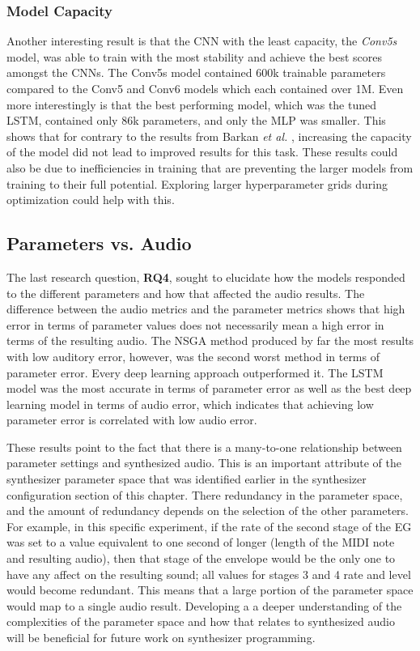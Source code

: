 \subsubsection{Model Capacity}
Another interesting result is that the CNN with the least capacity, the \textit{Conv5s} model, was able to train with the most stability and achieve the best scores amongst the CNNs. The Conv5s model contained 600k trainable parameters compared to the Conv5 and Conv6 models which each contained over 1M. Even more interestingly is that the best performing model, which was the tuned LSTM, contained only 86k parameters, and only the MLP was smaller. This shows that for contrary to the results from Barkan \textit{et al.} \cite{barkan2019inversynth}, increasing the capacity of the model did not lead to improved results for this task. These results could also be due to inefficiencies in training that are preventing the larger models from training to their full potential. Exploring larger hyperparameter grids during optimization could help with this.

\subsection{Parameters vs. Audio}
The last research question, \textbf{RQ4}, sought to elucidate how the models responded to the different parameters and how that affected the audio results. The difference between the audio metrics and the parameter metrics shows that high error in terms of parameter values does not necessarily mean a high error in terms of the resulting audio. The NSGA method produced by far the most results with low auditory error, however, was the second worst method in terms of parameter error. Every deep learning approach outperformed it. The LSTM model was the most accurate in terms of parameter error as well as the best deep learning model in terms of audio error, which indicates that achieving low parameter error is correlated with low audio error.

These results point to the fact that there is a many-to-one relationship between parameter settings and synthesized audio. This is an important attribute of the synthesizer parameter space that was identified earlier in the synthesizer configuration section of this chapter. There redundancy in the parameter space, and the amount of redundancy depends on the selection of the other parameters. For example, in this specific experiment, if the rate of the second stage of the EG was set to a value equivalent to one second of longer (length of the MIDI note and resulting audio), then that stage of the envelope would be the only one to have any affect on the resulting sound; all values for stages 3 and 4 rate and level would become redundant. This means that a large portion of the parameter space would map to a single audio result. Developing a a deeper understanding of the complexities of the parameter space and how that relates to synthesized audio will be beneficial for future work on synthesizer programming.

